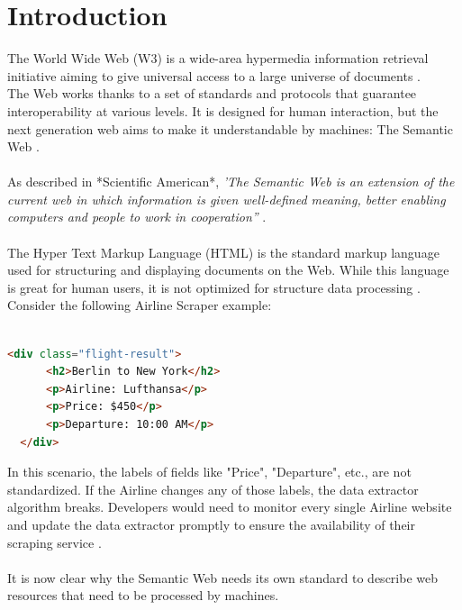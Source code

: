 \chapter{Introduction\label{cha:chapter1}}

The World Wide Web (W3) is a wide-area hypermedia information retrieval initiative aiming to give universal access to a large universe of documents \cite{www}.
\\
The Web works thanks to a set of standards and protocols that guarantee interoperability at various levels. 
It is designed for human interaction, but the next generation web aims to make it understandable by machines: The Semantic Web \cite{sematicWeb}.
\\
\\
As described in *Scientific American*, 
\textit{'The Semantic Web is an extension of the current web in which information is given well-defined meaning, better enabling computers and people to work in cooperation''} \cite{bernerslee2001semantic}.
\\
\\
The Hyper Text Markup Language (HTML) is the standard markup language used for structuring and displaying documents on the Web.
While this language is great for human users, it is not optimized for structure data processing \cite{herman2003semanticweb}. 
\\
Consider the following Airline Scraper example:
\\
\\
\begin{lstlisting}[language=HTML, caption={Example of HTML flight data from an Airline company}, label={lst:html-example}, frame=single]
  <div class="flight-result">
      <h2>Berlin to New York</h2>
      <p>Airline: Lufthansa</p>
      <p>Price: $450</p>
      <p>Departure: 10:00 AM</p>
  </div>
  \end{lstlisting}
In this scenario, the labels of fields like "Price", "Departure", etc., are not standardized. If the Airline changes any of those labels, the data extractor algorithm breaks. 
Developers would need to monitor every single Airline website and update the data extractor promptly to ensure the availability of their scraping service \cite{herman2003semanticweb}.
\\
\\
It is now clear why the Semantic Web needs its own standard to describe web resources that need to be processed by machines.
\\
\\
